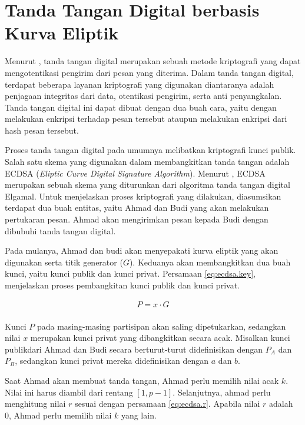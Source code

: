 \section{Tanda Tangan Digital berbasis Kurva Eliptik}
Menurut \textcite{munir2019}, tanda tangan digital merupakan sebuah metode kriptografi yang dapat mengotentikasi pengirim dari pesan yang diterima. Dalam tanda tangan digital, terdapat beberapa layanan kriptografi yang digunakan diantaranya adalah penjagaan integritas dari data, otentikasi pengirim, serta anti penyangkalan. Tanda tangan digital ini dapat dibuat dengan dua buah cara, yaitu dengan melakukan enkripsi terhadap pesan tersebut ataupun melakukan enkripsi dari hash pesan tersebut. 

Proses tanda tangan digital pada umumnya melibatkan kriptografi kunci publik. Salah satu skema yang digunakan dalam membangkitkan tanda tangan adalah ECDSA (\emph{Eliptic Curve Digital Signature Algorithm}). Menurut \textcite{munir2019}, ECDSA merupakan sebuah skema yang diturunkan dari algoritma tanda tangan digital Elgamal. Untuk menjelaskan proses kriptografi yang dilakukan, diasumsikan terdapat dua buah entitas, yaitu Ahmad dan Budi yang akan melakukan pertukaran pesan. Ahmad akan mengirimkan pesan kepada Budi dengan dibubuhi tanda tangan digital.

Pada mulanya, Ahmad dan budi akan menyepakati kurva eliptik yang akan digunakan serta titik generator ($G$). Keduanya akan membangkitkan dua buah kunci, yaitu kunci publik dan kunci privat. Persamaan \ref{eq:ecdsa.key}, menjelaskan proses pembangkitan kunci publik dan kunci privat.

\begin{equation}
  \label{eq:ecdsa.key}
  \begin{array}{l}   
    P = x \cdot G \\
  \end{array}
\end{equation}

Kunci $P$ pada masing-masing partisipan akan saling dipetukarkan, sedangkan nilai $x$ merupakan kunci privat yang dibangkitkan secara acak. Misalkan kunci publikdari Ahmad dan Budi secara berturut-turut didefinisikan dengan $P_{A}$ dan $P_{B}$, sedangkan kunci privat mereka didefinisikan dengan $a$ dan $b$.

Saat Ahmad akan membuat tanda tangan, Ahmad perlu memilih nilai acak $k$. Nilai ini harus diambil dari rentang $[1, p-1]$. Selanjutnya, ahmad perlu menghitung nilai $r$ sesuai dengan persamaan \ref{eq:ecdsa.r}. Apabila nilai $r$ adalah 0, Ahmad perlu memilih nilai $k$ yang lain.

